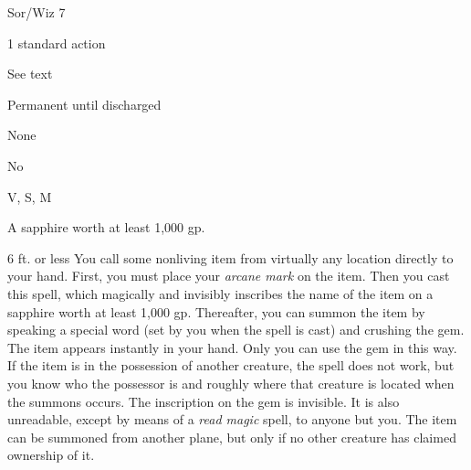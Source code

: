 
\begin{description*}
\item[Level:] Sor/Wiz 7
\item[Casting Time:] 1 standard action
\item[Range:] See text
\item[Duration:] Permanent until discharged
\item[Saving Throw:] None
\item[Spell Resistance:] No
\item[Components:] V, S, M
\item[Arcane Material Component:] A sapphire worth at least 1,000 gp.
\end{description*}

6 ft. or less
You call some nonliving item from virtually any location directly to your hand.
First, you must place your \textit{arcane mark} on the item. Then you cast this
spell, which magically and invisibly inscribes the name of the item on a sapphire
worth at least 1,000 gp. Thereafter, you can summon the item by speaking a special
word (set by you when the spell is cast) and crushing the gem. The item appears
instantly in your hand. Only you can use the gem in this way.
If the item is in the possession of another creature, the spell does not work,
but you know who the possessor is and roughly where that creature is located when
the summons occurs.
The inscription on the gem is invisible. It is also unreadable, except by means
of a \textit{read magic} spell, to anyone but you.
The item can be summoned from another plane, but only if no other creature has
claimed ownership of it.